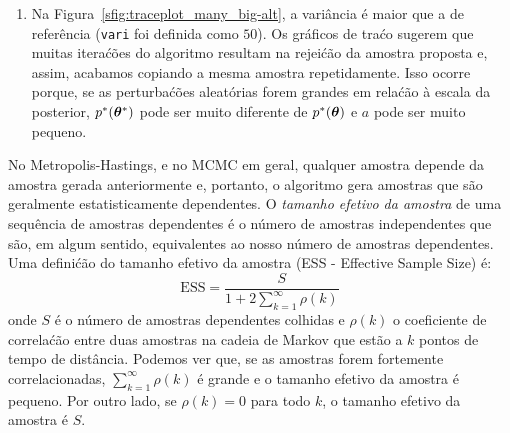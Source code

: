 \begin{exenumerate}
\begin{solution}
\begin{enumerate}[label=(\roman*)]
            Explica\'c\~ao mais matem\'atica: para uma distribui\'c\~ao de proposta sim\'etrica, a
            raz\~ao de aceita\'c\~ao $a$ torna-se:
            \begin{equation}
                a =  \frac{p^*(\thetab^*)}{p^*(\thetab)},
            \end{equation}
            onde $\thetab$ \'e a amostra atual e $\thetab^*$ \'e a amostra
            proposta. Para vari\^ancias que s\~ao pequenas em rela\'c\~ao \`a escala (ao quadrado)
            da posterior, $a$ est\'a pr\'oximo de um e a amostra proposta $\thetab^*$
            \'e provavelmente aceita. Isso d\'a origem \`as s\'eries temporais de mudan\'ca lenta
            mostradas na Figura~\ref{sfig:traceplot_many_small-alt}.
            
            \item Na Figura~\ref{sfig:traceplot_many_big-alt}, a vari\^ancia \'e
            maior que a de refer\^encia (\lstinline{vari} foi definida como $50$). Os gr\'aficos
            de tra\'co sugerem que muitas itera\'c\~oes do algoritmo resultam na
            rejei\'c\~ao da amostra proposta e, assim, acabamos copiando a
            mesma amostra repetidamente. Isso ocorre porque, se as perturba\'c\~oes aleat\'orias
            forem grandes em rela\'c\~ao \`a escala da
            posterior, $p^*(\boldsymbol{\theta}^*)$ pode ser muito diferente de
            $p^*(\boldsymbol{\theta})$ e $a$ pode ser muito pequeno.
            
        \end{enumerate}
        
    \end{solution}
    
    \item No Metropolis-Hastings, e no MCMC em geral, qualquer amostra depende
    da amostra gerada anteriormente e, portanto, o algoritmo
    gera amostras que s\~ao geralmente estatisticamente dependentes. O
    \textit{tamanho efetivo da amostra} de uma sequ\^encia de amostras dependentes \'e
    o n\'umero de amostras independentes que s\~ao, em algum sentido,
    equivalentes ao nosso n\'umero de amostras dependentes. Uma defini\'c\~ao do
    tamanho efetivo da amostra (ESS - Effective Sample Size) \'e:
    \begin{equation}
        \text{ESS} = \frac{S}{1+ 2\sum_{k=1}^{\infty} \rho(k)}
    \end{equation}
    onde $S$ \'e o n\'umero de amostras dependentes colhidas e $\rho(k)$ o
    coeficiente de correla\'c\~ao entre duas amostras na cadeia de Markov que
    est\~ao a $k$ pontos de tempo de dist\^ancia. Podemos ver que, se as amostras forem
    fortemente correlacionadas, $\sum_{k=1}^{\infty} \rho(k)$ \'e grande e o
    tamanho efetivo da amostra \'e pequeno. Por outro lado, se $\rho(k)=0$
    para todo $k$, o tamanho efetivo da amostra \'e $S$.
    

\end{exenumerate}
